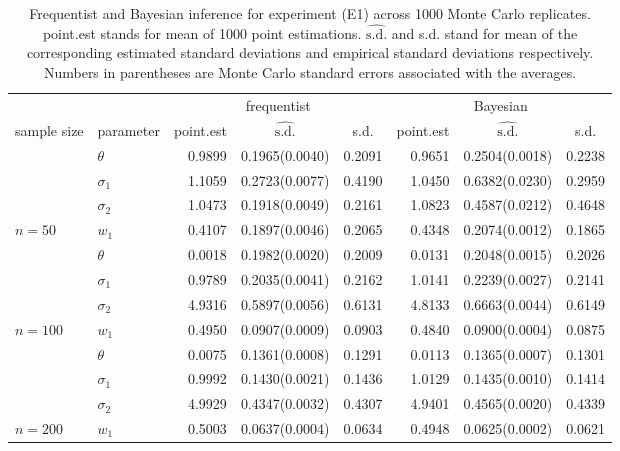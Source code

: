 \begin{table}

\caption{\label{tab:E1tab}Frequentist and Bayesian inference for experiment (E1) across 1000 Monte Carlo replicates. point.est stands for mean of 1000 point estimations. $\widehat{\text{s.d.}}$ and s.d. stand for mean of the corresponding estimated standard deviations and empirical standard deviations respectively. Numbers in parentheses are Monte Carlo standard errors associated with the averages.}
\centering
\begin{tabular}[t]{llrlrrlr}
\toprule
\multicolumn{1}{c}{ } & \multicolumn{1}{c}{ } & \multicolumn{3}{c}{frequentist} & \multicolumn{3}{c}{Bayesian} \\
\cmidrule(l{3pt}r{3pt}){3-5} \cmidrule(l{3pt}r{3pt}){6-8}
\multicolumn{1}{c}{sample size} & \multicolumn{1}{c}{parameter} & \multicolumn{1}{c}{point.est} & \multicolumn{1}{c}{$\widehat{\text{s.d.}}$} & \multicolumn{1}{c}{s.d.} & \multicolumn{1}{c}{point.est} & \multicolumn{1}{c}{$\widehat{\text{s.d.}}$} & \multicolumn{1}{c}{s.d.}\\
\midrule
 & $\theta$ & 0.9899 & 0.1965(0.0040) & 0.2091 & 0.9651 & 0.2504(0.0018) & 0.2238\\
\cmidrule{2-8}
 & $\sigma_1$ & 1.1059 & 0.2723(0.0077) & 0.4190 & 1.0450 & 0.6382(0.0230) & 0.2959\\
\cmidrule{2-8}
 & $\sigma_2$ & 1.0473 & 0.1918(0.0049) & 0.2161 & 1.0823 & 0.4587(0.0212) & 0.4648\\
\cmidrule{2-8}
\multirow{-4}{*}{\raggedright\arraybackslash $n=50$} & $w_1$ & 0.4107 & 0.1897(0.0046) & 0.2065 & 0.4348 & 0.2074(0.0012) & 0.1865\\
\cmidrule{1-8}
 & $\theta$ & 0.0018 & 0.1982(0.0020) & 0.2009 & 0.0131 & 0.2048(0.0015) & 0.2026\\
\cmidrule{2-8}
 & $\sigma_1$ & 0.9789 & 0.2035(0.0041) & 0.2162 & 1.0141 & 0.2239(0.0027) & 0.2141\\
\cmidrule{2-8}
 & $\sigma_2$ & 4.9316 & 0.5897(0.0056) & 0.6131 & 4.8133 & 0.6663(0.0044) & 0.6149\\
\cmidrule{2-8}
\multirow{-4}{*}{\raggedright\arraybackslash $n=100$} & $w_1$ & 0.4950 & 0.0907(0.0009) & 0.0903 & 0.4840 & 0.0900(0.0004) & 0.0875\\
\cmidrule{1-8}
 & $\theta$ & 0.0075 & 0.1361(0.0008) & 0.1291 & 0.0113 & 0.1365(0.0007) & 0.1301\\
\cmidrule{2-8}
 & $\sigma_1$ & 0.9992 & 0.1430(0.0021) & 0.1436 & 1.0129 & 0.1435(0.0010) & 0.1414\\
\cmidrule{2-8}
 & $\sigma_2$ & 4.9929 & 0.4347(0.0032) & 0.4307 & 4.9401 & 0.4565(0.0020) & 0.4339\\
\cmidrule{2-8}
\multirow{-4}{*}{\raggedright\arraybackslash $n=200$} & $w_1$ & 0.5003 & 0.0637(0.0004) & 0.0634 & 0.4948 & 0.0625(0.0002) & 0.0621\\
\bottomrule
\end{tabular}
\end{table}
